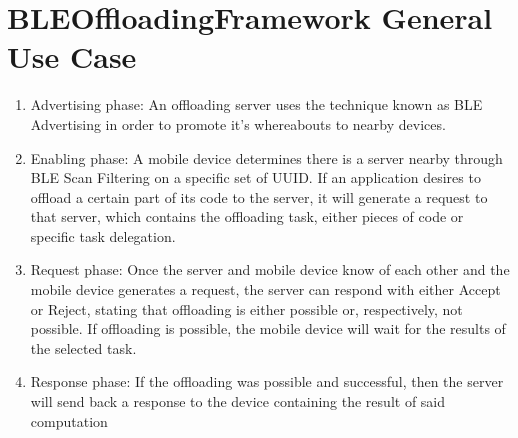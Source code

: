 \chapter{BLEOffloadingFramework General Use Case }
\label{appendix:bleoffloadingframework}



\begin{enumerate}
\item{ Advertising phase: An offloading server uses the technique known as BLE Advertising in order to promote it's whereabouts to nearby devices.}

\item{Enabling phase: A mobile device determines there is a server nearby through BLE Scan Filtering on a specific set of UUID. If an application desires to offload a certain part of its code to the server, it will generate a request to that server, which contains the offloading task, either pieces of code or specific task delegation.}

\item{Request phase: Once the server and mobile device know of each other and the mobile device generates a request, the server can respond with either Accept or Reject, stating that offloading is either possible or, respectively, not possible. If offloading is possible, the mobile device will wait for the results of the selected task.}

\item{Response phase: If the offloading was possible and successful, then the server will send back a response to the device containing the result of said computation}

\end{enumerate}

%

